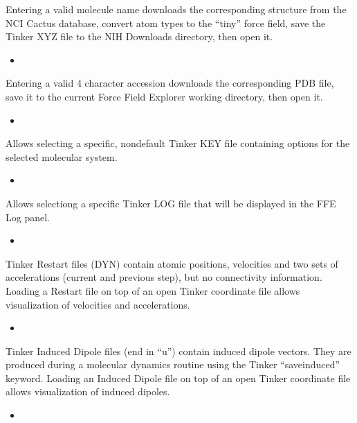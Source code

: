 \documentclass[letterpaper,11pt,english]{sphinxmanual}
\begin{document}
Entering a valid molecule name downloads the corresponding structure from the NCI Cactus database, convert atom types to the “tiny” force field, save the Tinker XYZ file to the NIH Downloads directory, then open it.
\begin{itemize}
\item {} 

\end{itemize}

Entering a valid 4 character accession downloads the corresponding PDB file, save it to the current Force Field Explorer working directory, then open it.
\begin{itemize}
\item {} 

\end{itemize}

Allows selecting a specific, non\sphinxhyphen{}default Tinker KEY file containing options for the selected molecular system.
\begin{itemize}
\item {} 

\end{itemize}

Allows selectiong a specific Tinker LOG file that will be displayed in the FFE Log panel.
\begin{itemize}
\item {} 

\end{itemize}

Tinker Restart files (DYN) contain atomic positions, velocities and two sets of accelerations (current and previous step), but no connectivity information. Loading a Restart file on top of an open Tinker coordinate file allows visualization of velocities and accelerations.
\begin{itemize}
\item {} 

\end{itemize}

Tinker Induced Dipole files (end in “u”) contain induced dipole vectors. They are produced during a molecular dynamics routine using the Tinker “save\sphinxhyphen{}induced” keyword. Loading an Induced Dipole file on top of an open Tinker coordinate file allows visualization of induced dipoles.
\begin{itemize}
\item {} 

\end{itemize}
\end{document}
